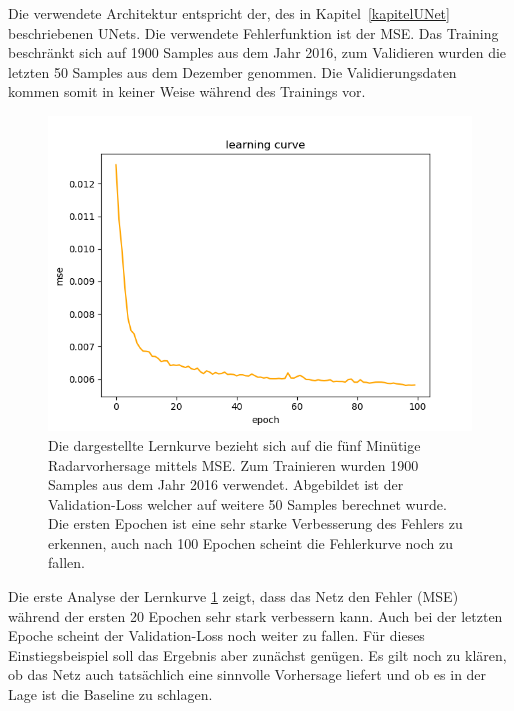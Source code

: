 Die verwendete Architektur entspricht der, des in Kapitel~\ref{kapitelUNet} beschriebenen UNets. Die verwendete Fehlerfunktion ist der MSE. Das Training beschränkt sich auf 1900 Samples aus dem Jahr 2016, zum Validieren wurden die letzten 50 Samples aus dem Dezember genommen. Die Validierungsdaten kommen somit in keiner Weise während des Trainings vor.
\begin{figure}[h]
	\centering
	\includegraphics[width=\linewidth]{pics/mse_learncurve}
	\caption[Lernkurve des UNets zur fünf-Minuten Vorhersage]{Die dargestellte Lernkurve bezieht sich auf die fünf Minütige Radarvorhersage mittels MSE. Zum Trainieren wurden 1900 Samples aus dem Jahr 2016 verwendet. Abgebildet ist der Validation-Loss welcher auf weitere 50 Samples berechnet wurde. Die ersten Epochen ist eine sehr starke Verbesserung des Fehlers zu erkennen, auch nach 100 Epochen scheint die Fehlerkurve noch zu fallen.}
	\label{mseLC}
\end{figure}

Die erste Analyse der Lernkurve \ref{mseLC} zeigt, dass das Netz den Fehler (MSE) während der ersten 20 Epochen sehr stark verbessern kann. Auch bei der letzten Epoche scheint der Validation-Loss noch weiter zu fallen. Für dieses Einstiegsbeispiel soll das Ergebnis aber zunächst genügen. Es gilt noch zu klären, ob das Netz auch tatsächlich eine sinnvolle Vorhersage liefert und ob es in der Lage ist die Baseline zu schlagen. 

